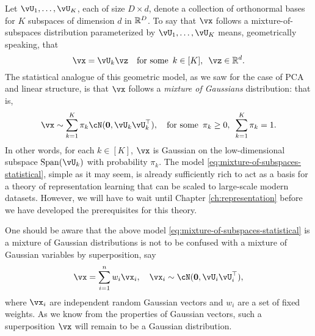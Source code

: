 \documentclass[\toplevelprefix/book-main.tex]{subfiles}
\begin{document}
Let $\vU_1, \dots, \vU_K$, each of size $D \times d$, denote a collection of orthonormal bases for $K$ subspaces of dimension $d$ in $\mathbb{R}^D$.
To say that $\vx$ follows a mixture-of-subspaces distribution parameterized by $\vU_1, \dots, \vU_K$ means, geometrically speaking,
that 
\begin{equation}\label{eq:mixture-of-subspaces-geometric}
    \vx = \vU_k \vz  \quad \text{for some} \enspace k \in [K],\enspace \vz \in \R^d.
\end{equation}
The statistical analogue of this geometric model, as we saw for the case of PCA and linear structure,
is that $\vx$ follows a \textit{mixture of Gaussians} distribution: that is,
\begin{equation}\label{eq:mixture-of-subspaces-statistical}
    \vx \sim \sum_{k=1}^K \pi_k \cN(\mathbf{0}, \vU_k\vU_k^\top), \quad \text{for some} \enspace \pi_k \geq 0,\enspace \sum_{k=1}^K \pi_k = 1.
\end{equation}
In other words, for each $k \in [K]$, $\vx$ is Gaussian on the low-dimensional subspace $\Span(\vU_k)$  with probability $\pi_k$.
The model \eqref{eq:mixture-of-subspaces-statistical}, simple as it may seem, is already sufficiently rich to act as a basis for a theory of representation learning that can be scaled to large-scale modern datasets. However, we will have to wait until Chapter \ref{ch:representation} before we have developed the prerequisites for this theory. 

\begin{remark}
One should be aware that the above model \eqref{eq:mixture-of-subspaces-statistical} is a mixture of Gaussian distributions is not to be confused with a mixture of Gaussian variables by superposition, say 
\begin{equation}
    \vx = \sum_{i=1}^n w_i \vx_i, \quad \vx_i \sim \cN(\mathbf{0}, \vU_i\vU_i^\top),
\end{equation}
where $\vx_i$ are independent random Gaussian vectors and $w_i$ are a set of fixed weights. As we know from the properties of Gaussian vectors, such a superposition $\vx$ will remain to be a Gaussian distribution.
\end{remark}
\end{document}
